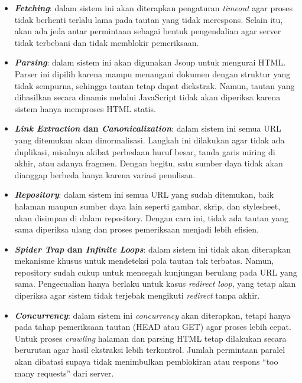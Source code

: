 \begin{itemize}
  \item \textbf{\textit{Fetching}}: dalam sistem ini akan diterapkan pengaturan \textit{timeout} agar proses tidak berhenti terlalu lama pada tautan yang tidak merespons. Selain itu, akan ada jeda antar permintaan sebagai bentuk pengendalian agar server tidak terbebani dan tidak memblokir pemeriksaan.
  
  \item \textbf{\textit{Parsing}}: dalam sistem ini akan digunakan Jsoup untuk mengurai HTML. Parser ini dipilih karena mampu menangani dokumen dengan struktur yang tidak sempurna, sehingga tautan tetap dapat diekstrak. Namun, tautan yang dihasilkan secara dinamis melalui JavaScript tidak akan diperiksa karena sistem hanya memproses HTML statis.
  
  \item \textbf{\textit{Link Extraction} dan \textit{Canonicalization}}: dalam sistem ini semua URL yang ditemukan akan dinormalisasi. Langkah ini dilakukan agar tidak ada duplikasi, misalnya akibat perbedaan huruf besar, tanda garis miring di akhir, atau adanya fragmen. Dengan begitu, satu sumber daya tidak akan dianggap berbeda hanya karena variasi penulisan.
  
  \item \textbf{\textit{Repository}}: dalam sistem ini semua URL yang sudah ditemukan, baik halaman maupun sumber daya lain seperti gambar, skrip, dan stylesheet, akan disimpan di dalam repository. Dengan cara ini, tidak ada tautan yang sama diperiksa ulang dan proses pemeriksaan menjadi lebih efisien.
  
  \item \textbf{\textit{Spider Trap} dan \textit{Infinite Loops}}: dalam sistem ini tidak akan diterapkan mekanisme khusus untuk mendeteksi pola tautan tak terbatas. Namun, repository sudah cukup untuk mencegah kunjungan berulang pada URL yang sama. Pengecualian hanya berlaku untuk kasus \textit{redirect loop}, yang tetap akan diperiksa agar sistem tidak terjebak mengikuti \textit{redirect} tanpa akhir.
  
  \item \textbf{\textit{Concurrency}}: dalam sistem ini \textit{concurrency} akan diterapkan, tetapi hanya pada tahap pemeriksaan tautan (HEAD atau GET) agar proses lebih cepat. Untuk proses \textit{crawling} halaman dan parsing HTML tetap dilakukan secara berurutan agar hasil ekstraksi lebih terkontrol. Jumlah permintaan paralel akan dibatasi supaya tidak menimbulkan pemblokiran atau respons “too many requests” dari server.
\end{itemize}



